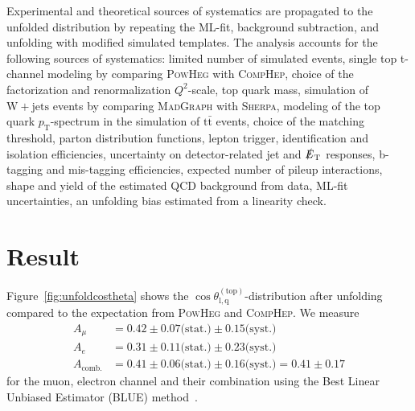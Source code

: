 \documentclass[a4paper]{jpconf}
\newcommand{\wjets}[0]{\mathrm{W+jets}}
\newcommand{\ttbar}[0]{\ensuremath{\mathrm{t\bar{t}}}}
\newcommand{\costheta}[0]{\cos\theta_{\mathrm{l,q}}^{\mathrm{(top)}}}
\newcommand{\pT}[0]{\ensuremath{p_\mathrm{T}}}
\newcommand{\met}[0]{\ensuremath{\slashed E_\mathrm{T}}}
\begin{document}
Experimental and theoretical sources of systematics are propagated to the unfolded distribution by repeating the ML-fit, background subtraction, and unfolding with modified simulated templates. The analysis accounts for the following sources of systematics: limited number of simulated events, single top t-channel modeling by comparing \textsc{PowHeg} with \textsc{CompHep}, choice of the factorization and renormalization $Q^{2}$-scale, top quark mass, simulation of $\wjets$ events by comparing \textsc{MadGraph} with \textsc{Sherpa}, modeling of the  top quark $\pT$-spectrum in the simulation of $\ttbar$ events, choice of the matching threshold, parton distribution functions, lepton trigger, identification and isolation efficiencies, uncertainty on detector-related jet and $\met$ responses, b-tagging and mis-tagging efficiencies, expected number of pileup interactions, shape and yield of the estimated QCD background from data, ML-fit uncertainties, an unfolding bias estimated from a linearity check.






\section{Result}

Figure~\ref{fig:unfoldcostheta} shows the $\costheta$-distribution after unfolding compared to the expectation from \textsc{PowHeg} and \textsc{CompHep}. We measure
\begin{align}
A_{\mu}&=0.42\pm 0.07 \textrm{(stat.)} \pm 0.15 \textrm{(syst.)} \\
A_{e}&=0.31\pm 0.11 \textrm{(stat.)} \pm 0.23 \textrm{(syst.)} \\
A_{\mathrm{comb.}}&=0.41\pm 0.06 \textrm{(stat.)} \pm 0.16 \textrm{(syst.)} = 0.41\pm 0.17
\end{align}
for the muon, electron channel and their combination using the Best Linear Unbiased Estimator (BLUE) method~\cite{blue}.
\end{document}

